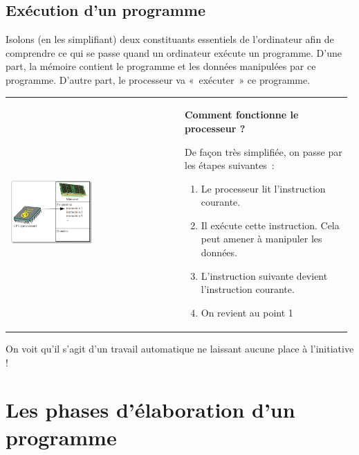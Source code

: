 	\subsection{Exécution d'un programme}

		Isolons (en les simplifiant) deux constituants essentiels de
		l'ordinateur afin de comprendre ce qui se passe quand
		un ordinateur exécute un programme. D'une part, la
		mémoire contient le programme et les données manipulées par ce
		programme. D'autre part, le processeur va «~exécuter~»
		ce programme.

		\begin{tabular}{m{0.50\linewidth}m{0.48\linewidth}}
			\begin{center}
			\includegraphics[width=0.5\textwidth]{image/intro-schema-ordi}
			\end{center}
		&
			\textbf{Comment fonctionne le processeur ?}
	
			De façon très simplifiée, on passe par les étapes suivantes~:
	
			\begin{enumerate}
			\item Le processeur lit l'instruction courante.
			\item Il exécute cette instruction. Cela peut amener à manipuler les données.
			\item L'instruction suivante devient l'instruction courante.
			\item On revient au point 1
			\end{enumerate}
		\\
		\end{tabular}

		On voit qu'il s'agit d'un travail
		automatique ne laissant aucune place à l'initiative !

\section{Les phases d'élaboration d'un programme}

